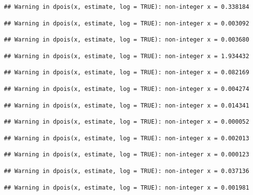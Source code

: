 \documentclass[]{article}
\begin{document}
\begin{verbatim}
## Warning in dpois(x, estimate, log = TRUE): non-integer x = 0.338184
\end{verbatim}

\begin{verbatim}
## Warning in dpois(x, estimate, log = TRUE): non-integer x = 0.003092
\end{verbatim}

\begin{verbatim}
## Warning in dpois(x, estimate, log = TRUE): non-integer x = 0.003680
\end{verbatim}

\begin{verbatim}
## Warning in dpois(x, estimate, log = TRUE): non-integer x = 1.934432
\end{verbatim}

\begin{verbatim}
## Warning in dpois(x, estimate, log = TRUE): non-integer x = 0.082169
\end{verbatim}

\begin{verbatim}
## Warning in dpois(x, estimate, log = TRUE): non-integer x = 0.004274
\end{verbatim}

\begin{verbatim}
## Warning in dpois(x, estimate, log = TRUE): non-integer x = 0.014341
\end{verbatim}

\begin{verbatim}
## Warning in dpois(x, estimate, log = TRUE): non-integer x = 0.000052
\end{verbatim}

\begin{verbatim}
## Warning in dpois(x, estimate, log = TRUE): non-integer x = 0.002013
\end{verbatim}

\begin{verbatim}
## Warning in dpois(x, estimate, log = TRUE): non-integer x = 0.000123
\end{verbatim}

\begin{verbatim}
## Warning in dpois(x, estimate, log = TRUE): non-integer x = 0.037136
\end{verbatim}

\begin{verbatim}
## Warning in dpois(x, estimate, log = TRUE): non-integer x = 0.001981
\end{verbatim}
\end{document}
